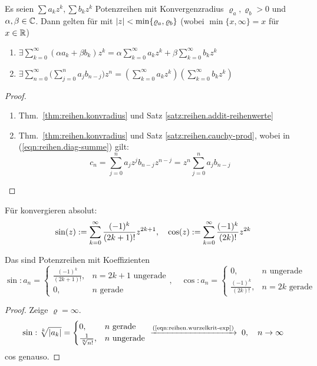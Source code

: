 \documentclass[12pt]{scrreprt}
\begin{document}
\begin{satz}\label{bsp:reihen.potreihe-reg}
Es seien $\sum a_kz^k, \sum b_kz^k$ Potenzreihen mit Konvergenzradius $\varrho_a, \varrho_b > 0$ und $\alpha, \beta \in \mathbb{C}$.
Dann gelten für  mit $\left\lvert z\right\lvert < \min \{\varrho_a, \varrho_b\}$ (wobei $\min \{x, \infty\} = x$ für $x\in\mathbb{R}$)
\begin{enumerate}
\item $\exists \sum\limits_{k=0}^\infty (\alpha a_k + \beta b_k) z^k = \alpha \sum\limits_{k=0}^\infty a_kz^k + \beta \sum\limits_{k=0}^\infty b_kz^k$\label{bsp:reihen.potreihe-reg.a}

\item $\exists \sum\limits_{n=0}^\infty \biggl(\sum\limits_{j=0}^n a_jb_{n-j}\biggr)z^n = \left(\sum\limits_{k=0}^\infty a_kz^k\right)\left(\sum\limits_{k=0}^\infty b_kz^k\right)$\label{bsp:reihen.potreihe-reg.b}
\end{enumerate}
\end{satz}
\begin{proof}
\begin{enumerate}
\item Thm.~\ref{thm:reihen.konvradius} und Satz \ref{satz:reihen.addit-reihenwerte}
\item Thm.~\ref{thm:reihen.konvradius} und Satz \ref{satz:reihen.cauchy-prod}, wobei in (\ref{eqn:reihen.diag-summe}) gilt:
\[c_n = \sum_{j=0}^n a_jz^jb_{n-j}z^{n-j} = z^n \sum_{j=0}^n a_j b_{n-j}\]
\end{enumerate}
\end{proof}

\begin{bsp}\label{bsp:reihen.sin-cos}
Für  konvergieren absolut:
\[\sin(z) := \sum_{k=0}^\infty \frac{(-1)^k}{(2k+1)!} z^{2k+1},\quad
\cos(z) := \sum_{k=0}^\infty \frac{(-1)^k}{(2k)!} z^{2k}\]

\noindent Das sind Potenzreihen mit Koeffizienten
\[\sin\colon a_n = \begin{cases}
\frac{(-1)^k}{(2k+1)!}, & n= 2k+1 \text{ ungerade}\\
0, & \text{$n$ gerade}
\end{cases},\quad
\cos\colon a_n = \begin{cases}
0, & \text{$n$ ungerade}\\
\frac{(-1)^k}{(2k)!}, & n= 2k \text{ gerade}
\end{cases}\]
\end{bsp}
\begin{proof}
Zeige $\varrho = \infty$. \[\sin: \sqrt[k]{\abs{a_k}} = 
\begin{cases}
0, & n\text{ gerade}\\
\frac{1}{\sqrt[n]{n!}}, & n\text{ ungerade}
\end{cases} \tonach{(\ref{eqn:reihen.wurzelkrit-exp})} 0,\quad\ninf\]
cos genauso.
\end{proof}
\end{document}
